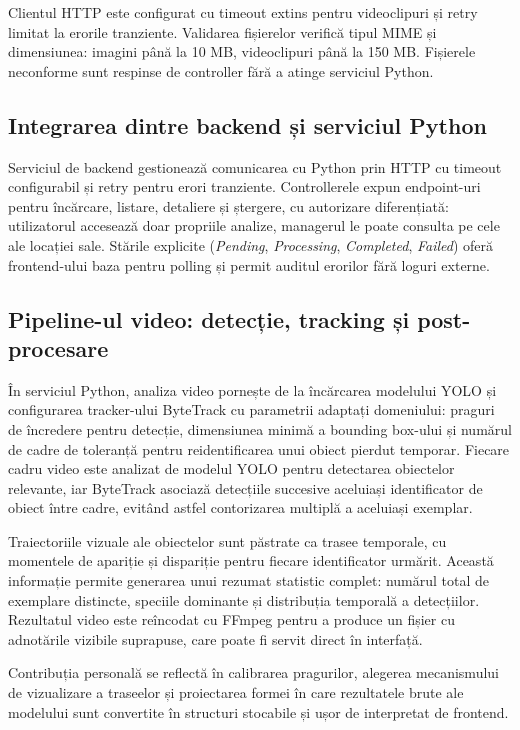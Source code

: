 Clientul HTTP este configurat cu timeout extins pentru videoclipuri și retry limitat la erorile tranziente. Validarea fișierelor verifică tipul MIME și dimensiunea: imagini până la 10 MB, videoclipuri până la 150 MB. Fișierele neconforme sunt respinse de controller fără a atinge serviciul Python.

\subsection{Integrarea dintre backend și serviciul Python}

Serviciul de backend gestionează comunicarea cu Python prin HTTP cu timeout configurabil și retry pentru erori tranziente. Controllerele expun endpoint-uri pentru încărcare, listare, detaliere și ștergere, cu autorizare diferențiată: utilizatorul accesează doar propriile analize, managerul le poate consulta pe cele ale locației sale. Stările explicite (\emph{Pending}, \emph{Processing}, \emph{Completed}, \emph{Failed}) oferă frontend-ului baza pentru polling și permit auditul erorilor fără loguri externe.

\subsection{Pipeline-ul video: detecție, tracking și post-procesare}

În serviciul Python, analiza video pornește de la încărcarea modelului YOLO și configurarea tracker-ului ByteTrack cu parametrii adaptați domeniului: praguri de încredere pentru detecție, dimensiunea minimă a bounding box-ului și numărul de cadre de toleranță pentru reidentificarea unui obiect pierdut temporar. Fiecare cadru video este analizat de modelul YOLO pentru detectarea obiectelor relevante, iar ByteTrack asociază detecțiile succesive aceluiași identificator de obiect între cadre, evitând astfel contorizarea multiplă a aceluiași exemplar.

Traiectoriile vizuale ale obiectelor sunt păstrate ca trasee temporale, cu momentele de apariție și dispariție pentru fiecare identificator urmărit. Această informație permite generarea unui rezumat statistic complet: numărul total de exemplare distincte, speciile dominante și distribuția temporală a detecțiilor. Rezultatul video este reîncodat cu FFmpeg pentru a produce un fișier cu adnotările vizibile suprapuse, care poate fi servit direct în interfață.

Contribuția personală se reflectă în calibrarea pragurilor, alegerea mecanismului de vizualizare a traseelor și proiectarea formei în care rezultatele brute ale modelului sunt convertite în structuri stocabile și ușor de interpretat de frontend.


